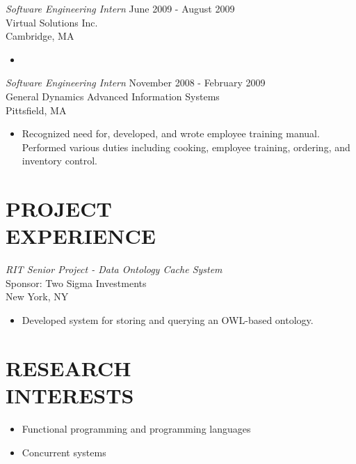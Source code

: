 \documentclass[margin]{res}
\begin{document}
\begin{resume}
                {\sl Software Engineering Intern} \hfill            June 2009 - August 2009 \\
                Virtual Solutions Inc. \\ 
                Cambridge, MA
                 \begin{itemize}  \itemsep -2pt %
                  \item 
                 \end{itemize} 
                {\sl Software Engineering Intern} \hfill        November 2008 - February 2009 \\
                General Dynamics Advanced Information Systems \\
                Pittsfield, MA
                  \begin{itemize}
                   \item Recognized need for, developed, and wrote 
                    employee training manual. Performed various 
                    duties including cooking, employee training, 
                    ordering, and inventory control. 
                  \end{itemize} 
 
\section{PROJECT \\ EXPERIENCE}
                {\sl RIT Senior Project - Data Ontology Cache System} \\
                Sponsor: Two Sigma Investments \\
                New York, NY
                  \begin{itemize} \itemsep -2pt
                   \item Developed system for storing and querying an
                     OWL-based ontology.
                  \end{itemize}

\section{RESEARCH \\ INTERESTS}             
                 \begin{itemize}  \itemsep -2pt
                 \item Functional programming and programming languages
                 \item Concurrent systems
                 \end{itemize}
 

\end{resume}
\end{document}
